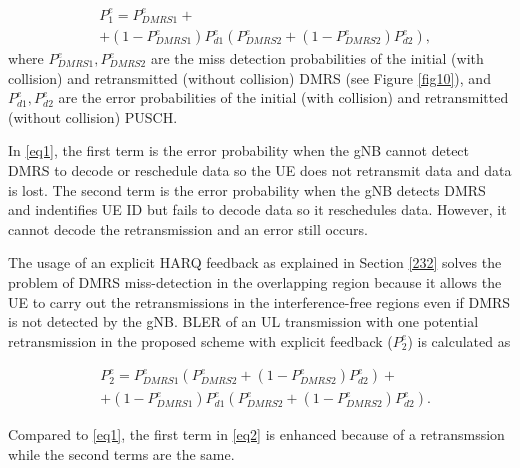\documentclass{report}
\begin{document}
\begin{equation}
\begin{split}
 &P^{e}_{1} = P^{e}_{DMRS1} + \\
        &+ (1-P^{e}_{DMRS1})P^{e}_{d1}(P^{e}_{DMRS2} + (1-P^{e}_{DMRS2})P^{e}_{d2}),\label{eq1}   
\end{split}
\end{equation}
where $ P^{e}_{DMRS1}, P^{e}_{DMRS2}$ are the miss detection probabilities of the initial (with collision) and retransmitted (without collision) DMRS (see Figure \ref{fig10}), and $P^{e}_{d1}, P^{e}_{d2}$ are the error probabilities of the initial (with collision) and retransmitted (without collision) PUSCH.

In \eqref{eq1}, the first term is the error probability when the gNB cannot detect DMRS to decode or reschedule data so the UE does not retransmit data and data is lost. The second term is the error probability when the gNB detects DMRS and indentifies UE ID but fails to decode data so it reschedules data. However, it cannot decode the retransmission and an error still occurs.

The usage of an explicit HARQ feedback as explained in Section \ref{232} solves the problem of DMRS miss-detection in the overlapping region because it allows the UE to carry out the retransmissions in the interference-free regions even if DMRS is not detected by the gNB. BLER of an UL transmission with one potential retransmission in the proposed scheme with explicit feedback ($ P^{e}_{2}$) is calculated as\useshortskip

\begin{equation}
\begin{split}
 &P^{e}_{2} = P^{e}_{DMRS1}(P^{e}_{DMRS2} + (1-P^{e}_{DMRS2})P^{e}_{d2}) + \\
        &+ (1-P^{e}_{DMRS1})P^{e}_{d1}(P^{e}_{DMRS2} + (1-P^{e}_{DMRS2})P^{e}_{d2}).\label{eq2}   
\end{split}
\end{equation}

Compared to \eqref{eq1}, the first term in \eqref{eq2} is enhanced because of a retransmssion while the second terms are the same.
\end{document}
